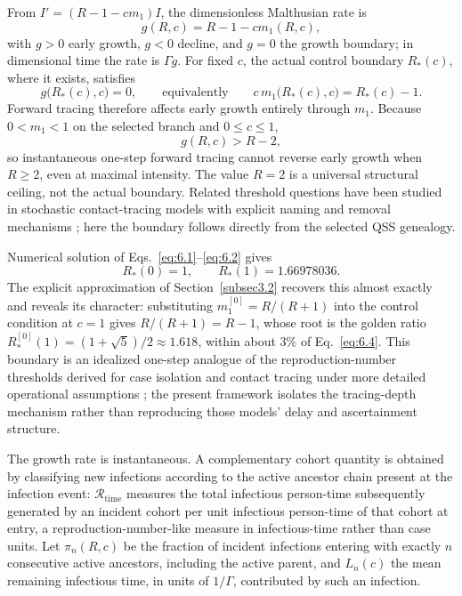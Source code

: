 \documentclass[review,12pt]{elsarticle}
\numberwithin{equation}{section}
\theoremstyle{remark}
\begin{document}
From $I'=(R-1-cm_1)I$, the dimensionless Malthusian rate is
\begin{equation}
g(R,c) = R-1-cm_1(R,c),
\label{eq:6.1}
\end{equation}
with $g>0$ early growth, $g<0$ decline, and $g=0$ the growth boundary; in dimensional time the rate is $\Gamma g$. For fixed $c$, the actual control boundary $R_*(c)$, where it exists, satisfies
\begin{equation}
g\bigl(R_*(c),c\bigr) = 0, \qquad\text{equivalently}\qquad c\,m_1\bigl(R_*(c),c\bigr) = R_*(c)-1.
\label{eq:6.2}
\end{equation}
Forward tracing therefore affects early growth entirely through $m_1$. Because $0<m_1<1$ on the selected branch and $0\leq c\leq1$,
\begin{equation}
g(R,c) > R-2,
\label{eq:6.3}
\end{equation}
so instantaneous one-step forward tracing cannot reverse early growth when $R\geq2$, even at maximal intensity. The value $R=2$ is a universal structural ceiling, not the actual boundary. Related threshold questions have been studied in stochastic contact-tracing models with explicit naming and removal mechanisms \cite{ball2011,muller2000}; here the boundary follows directly from the selected QSS genealogy.

Numerical solution of Eqs.~\eqref{eq:6.1}--\eqref{eq:6.2} gives
\begin{equation}
R_*(0) = 1, \qquad R_*(1) = 1.66978036.
\label{eq:6.4}
\end{equation}
The explicit approximation of Section~\ref{subsec3.2} recovers this almost exactly and reveals its character: substituting $m_1^{[0]}=R/(R+1)$ into the control condition at $c=1$ gives $R/(R+1)=R-1$, whose root is the golden ratio $R_*^{[0]}(1)=(1+\sqrt5)/2\approx1.618$, within about 3\% of Eq.~\eqref{eq:6.4}. This boundary is an idealized one-step analogue of the reproduction-number thresholds derived for case isolation and contact tracing under more detailed operational assumptions \cite{fraser2004,hellewell2020,ferretti2020,kucharski2020}; the present framework isolates the tracing-depth mechanism rather than reproducing those models' delay and ascertainment structure.

The growth rate is instantaneous. A complementary cohort quantity is obtained by classifying new infections according to the active ancestor chain present at the infection event: $\mathcal R_{\mathrm{time}}$ measures the total infectious person-time subsequently generated by an incident cohort per unit infectious person-time of that cohort at entry, a reproduction-number-like measure in infectious-time rather than case units. Let $\pi_n(R,c)$ be the fraction of incident infections entering with exactly $n$ consecutive active ancestors, including the active parent, and $L_n(c)$ the mean remaining infectious time, in units of $1/\Gamma$, contributed by such an infection.
\end{document}
